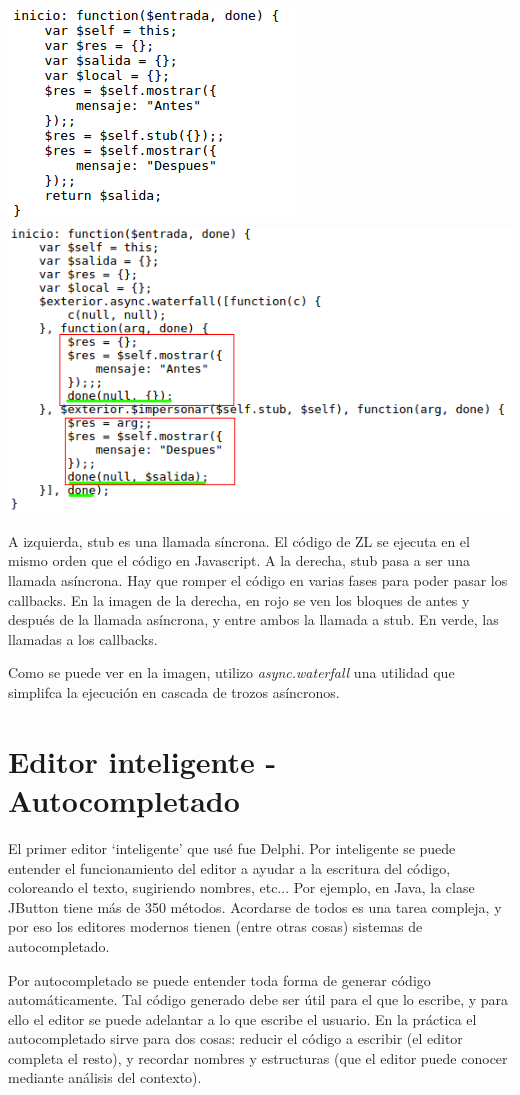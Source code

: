 \documentclass{report}
\begin{document}
	\begin{center}
	\includegraphics[width=0.45\linewidth]{asincrono3}
	\includegraphics[width=0.45\linewidth]{asincrono2}
	
	A izquierda, stub es una llamada síncrona. El código de ZL se ejecuta en el mismo orden que el código en Javascript. A la derecha, stub pasa a ser una llamada asíncrona. Hay que romper el código en varias fases para poder pasar los callbacks. En la imagen de la derecha, en rojo se ven los bloques de antes y después de la llamada asíncrona, y entre ambos la llamada a stub. En verde, las llamadas a los callbacks.
	\end{center}

	 Como se puede ver en la imagen, utilizo \textit{async.waterfall} una utilidad\cite{async} que simplifca la ejecución en cascada de trozos asíncronos.
	
	\section{Editor inteligente - Autocompletado}
	
	El primer editor `inteligente' que usé fue Delphi. Por inteligente se puede entender el funcionamiento del editor a ayudar a la escritura del código, coloreando el texto, sugiriendo nombres, etc... Por ejemplo, en Java, la clase JButton tiene más de 350 métodos. Acordarse de todos es una tarea compleja, y por eso los editores modernos tienen (entre otras cosas) sistemas de autocompletado. 
	
	\vspace{10px}
	
	Por autocompletado se puede entender toda forma de generar código automáticamente. Tal código generado debe ser útil para el que lo escribe, y para ello el editor se puede adelantar a lo que escribe el usuario. En la práctica el autocompletado sirve para dos cosas: reducir el código a escribir (el editor completa el resto), y recordar nombres y estructuras (que el editor puede conocer mediante análisis del contexto).
	
\end{document}
